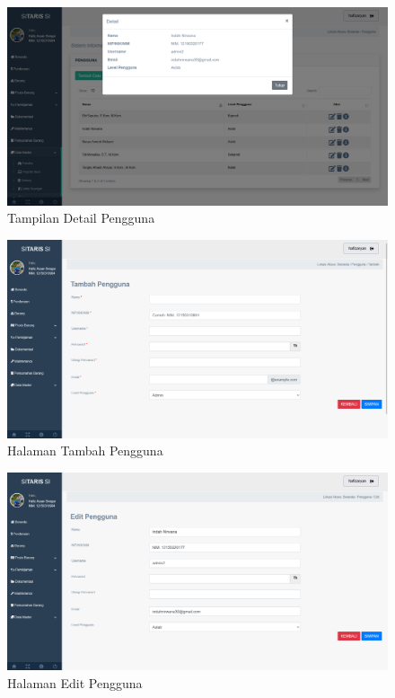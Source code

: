 \begin{enumerate}
        \begin{figure}
          \centering
          \includegraphics[width=0.82\linewidth]{konten//gambar/user detail.png}
          \caption{Tampilan Detail Pengguna}
          \label{fig:enter-label}
        \end{figure}

        \begin{figure}
          \centering
          \includegraphics[width=0.82\linewidth]{konten//gambar/user tambah.png}
          \caption{Halaman Tambah Pengguna}
          \label{fig:enter-label}
        \end{figure}

        \begin{figure}
          \centering
          \includegraphics[width=0.82\linewidth]{konten//gambar/user edit.png}
          \caption{Halaman Edit Pengguna}
          \label{fig:enter-label}
        \end{figure}


\end{enumerate}
